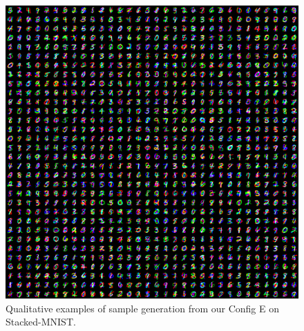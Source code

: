 {
\begin{figure}[h!]
    \setlength{\imgsize}{\linewidth} %
    
    \setlength{\tabcolsep}{0pt} %
    \renewcommand{\arraystretch}{0} %

    \newcommand{\qualitativeimg}[1]{%
        \texttt{[image: figures/qualitative/stacked-mnist-000008806/number-\#1.jpg]}%
    }
    \centering
    \includegraphics[width=\linewidth, clip, trim={0 0 768px 768px}]{figures/qualitative/stacked-mnist-000008806.jpg}
    \caption{Qualitative examples of sample generation from our Config E on Stacked-MNIST.}
    \label{fig:stacked-mnist}
\end{figure}
}